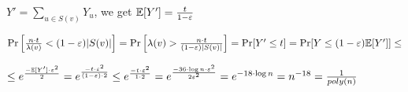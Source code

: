 $Y' = \sum\limits_{u \in S(v)} Y_u$, we get $\mathbb{E}[Y'] = \frac{t}{1 - \varepsilon}$

$
\Pr\left[\frac{n\cdot t}{\lambda(v)} < (1 - \varepsilon) |S(v)|\right] = 
\Pr\left[\lambda(v) > \frac{n\cdot t}{(1 - \varepsilon) |S(v)|}\right] =
\Pr[Y' \leq t] = 
\Pr[Y \leq (1 - \varepsilon)\mathbb{E}[Y']] \leq 
$

$ \leq
e^{\frac{-\mathbb{E}[Y']\cdot\varepsilon^2}{2}} =
e^{\frac{-t\cdot\varepsilon^2}{(1 - \varepsilon)\cdot 2}} \leq
e^{\frac{-t\cdot\varepsilon^2}{1 \cdot 2}}  =
e^{\frac{-36\cdot \log n \cdot\varepsilon^2}{2\varepsilon^2}} = 
e^{-18\cdot \log n} = 
n^{-18} = 
\frac{1}{poly(n)}$


